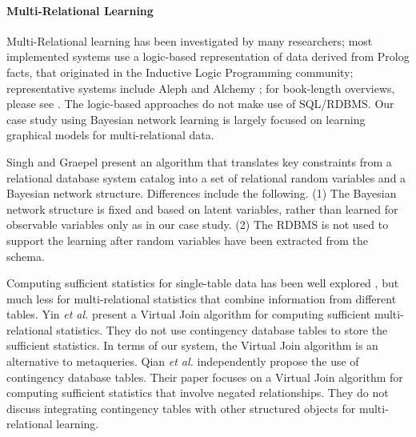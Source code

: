 \documentclass{acm_proc_article-sp}
\begin{document}
\paragraph{Multi-Relational Learning} 
Multi-Relational learning has been investigated by many researchers; 
most implemented systems use a logic-based representation of data derived from Prolog facts, that originated in the Inductive Logic Programming community; representative systems include Aleph and  Alchemy \cite{Kok2009a};
for book-length overviews, please see \cite{SRL2007,Domingos2009,Dzeroski2001c,sun2012mining}.
The logic-based approaches do not make use of SQL/RDBMS.
Our case study using Bayesian network learning 
is largely focused on learning graphical models for multi-relational data.

Singh and Graepel \cite{Graepel_CIKM13} present an algorithm that translates key constraints from a relational database system catalog into a set of relational random variables and a Bayesian network structure. 
Differences include the following. (1) The Bayesian network structure is fixed and based on latent variables, rather than learned for observable variables only as in our case study. (2) The RDBMS is not used to support the learning after random variables have been extracted from the schema. 

Computing sufficient statistics for single-table data  has been well explored \cite{Moore1998,Graefe1998}, but much less for multi-relational statistics that combine information from different tables.
Yin {\em et al.} \cite{Yin2004} present a Virtual Join algorithm for computing sufficient multi-relational statistics. They do not use contingency database tables to store the sufficient statistics. In terms of our system, the Virtual Join algorithm is an alternative to metaqueries. Qian {\em et al.} \cite{Qian2014} independently propose the use of contingency database tables. Their paper focuses on a Virtual Join algorithm for computing sufficient statistics that involve negated relationships. They do not discuss integrating contingency tables with other structured objects for multi-relational learning. 
\end{document}
